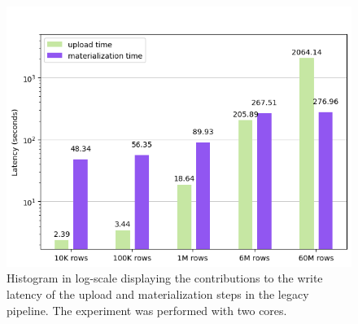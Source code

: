 \begin{figure}
\begin{minipage}[b]{\textwidth}
        \includegraphics[width=\textwidth]{figures/7-appendix/results_diagrams/write/hudi_upload_materialize/hudi_virtualiz2_core.png}
        \caption[Histogram of write on legacy pipeline - Latency breakdown - 2 CPU cores]{Histogram in log-scale displaying the contributions to the write latency of the upload and materialization steps in the legacy pipeline. The experiment was performed with two  cores.}
        \label{fig:appx_hudi_virtualiz_breakdown_2_core}
    \end{minipage}
\end{figure}

